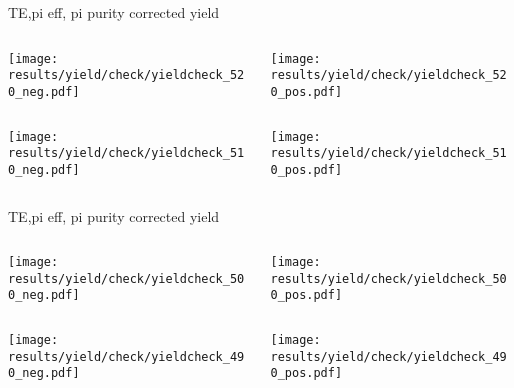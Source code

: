 \begin{frame}{TE,pi eff, pi purity corrected yield}
\begin{columns}
\begin{column}[T]{0.5\textwidth}
\texttt{[image: results/yield/check/yieldcheck\_520\_neg.pdf]}
\end{column}
\begin{column}[T]{0.5\textwidth}
\texttt{[image: results/yield/check/yieldcheck\_520\_pos.pdf]}
\end{column}
\end{columns}
\begin{columns}
\begin{column}[T]{0.5\textwidth}
\texttt{[image: results/yield/check/yieldcheck\_510\_neg.pdf]}
\end{column}
\begin{column}[T]{0.5\textwidth}
\texttt{[image: results/yield/check/yieldcheck\_510\_pos.pdf]}
\end{column}
\end{columns}
\end{frame}
\begin{frame}{TE,pi eff, pi purity corrected yield}
\begin{columns}
\begin{column}[T]{0.5\textwidth}
\texttt{[image: results/yield/check/yieldcheck\_500\_neg.pdf]}
\end{column}
\begin{column}[T]{0.5\textwidth}
\texttt{[image: results/yield/check/yieldcheck\_500\_pos.pdf]}
\end{column}
\end{columns}
\begin{columns}
\begin{column}[T]{0.5\textwidth}
\texttt{[image: results/yield/check/yieldcheck\_490\_neg.pdf]}
\end{column}
\begin{column}[T]{0.5\textwidth}
\texttt{[image: results/yield/check/yieldcheck\_490\_pos.pdf]}
\end{column}
\end{columns}
\end{frame}
